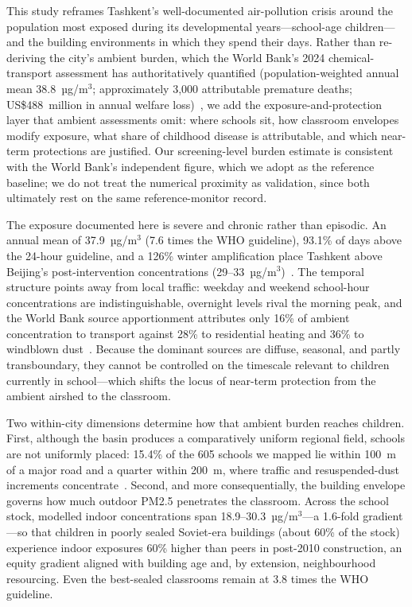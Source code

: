 \documentclass[11pt,a4paper]{article}
\begin{document}
This study reframes Tashkent's well-documented air-pollution crisis around the population most exposed during its developmental years---school-age children---and the building environments in which they spend their days. Rather than re-deriving the city's ambient burden, which the World Bank's 2024 chemical-transport assessment has authoritatively quantified (population-weighted annual mean 38.8~µg/m$^3$; approximately 3,000 attributable premature deaths; US\$488~million in annual welfare loss)~\cite{worldbank2024tashkent}, we add the exposure-and-protection layer that ambient assessments omit: where schools sit, how classroom envelopes modify exposure, what share of childhood disease is attributable, and which near-term protections are justified. Our screening-level burden estimate is consistent with the World Bank's independent figure, which we adopt as the reference baseline; we do not treat the numerical proximity as validation, since both ultimately rest on the same reference-monitor record.

The exposure documented here is severe and chronic rather than episodic. An annual mean of 37.9~µg/m$^3$ (7.6 times the WHO guideline), 93.1\% of days above the 24-hour guideline, and a 126\% winter amplification place Tashkent above Beijing's post-intervention concentrations (29--33~µg/m$^3$)~\cite{crea2023china}. The temporal structure points away from local traffic: weekday and weekend school-hour concentrations are indistinguishable, overnight levels rival the morning peak, and the World Bank source apportionment attributes only 16\% of ambient concentration to transport against 28\% to residential heating and 36\% to windblown dust~\cite{worldbank2024tashkent}. Because the dominant sources are diffuse, seasonal, and partly transboundary, they cannot be controlled on the timescale relevant to children currently in school---which shifts the locus of near-term protection from the ambient airshed to the classroom.

Two within-city dimensions determine how that ambient burden reaches children. First, although the basin produces a comparatively uniform regional field, schools are not uniformly placed: 15.4\% of the 605 schools we mapped lie within 100~m of a major road and a quarter within 200~m, where traffic and resuspended-dust increments concentrate~\cite{apte2017high,khreis2017exposure}. Second, and more consequentially, the building envelope governs how much outdoor PM2.5 penetrates the classroom. Across the school stock, modelled indoor concentrations span 18.9--30.3~µg/m$^3$---a 1.6-fold gradient---so that children in poorly sealed Soviet-era buildings (about 60\% of the stock) experience indoor exposures 60\% higher than peers in post-2010 construction, an equity gradient aligned with building age and, by extension, neighbourhood resourcing. Even the best-sealed classrooms remain at 3.8 times the WHO guideline.
\end{document}

